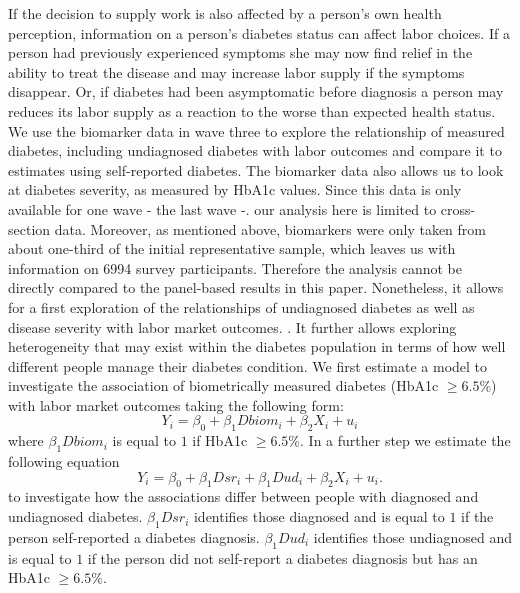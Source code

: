 \documentclass[12pt,english,british]{article}
\begin{document}
If the decision to supply work is also affected by a person's own health perception, information on a person's diabetes status can affect labor choices. If a person had previously experienced symptoms she may now find relief in the ability to treat the disease and may increase labor supply if the symptoms disappear. Or, if diabetes had been asymptomatic before diagnosis a person may reduces its labor supply as a reaction to the worse than expected health status.  We use the biomarker data in wave three to explore the relationship of measured diabetes, including undiagnosed diabetes with labor outcomes and compare it to estimates using self-reported diabetes. The biomarker data also allows us to look at diabetes severity, as measured
by \ac{HbA1c} values. Since this data is only available for one wave - the
last wave -. our analysis here is limited to cross-section data. Moreover,
as mentioned above, biomarkers were only taken from about one-third  of the initial representative sample, which leaves
us with information on 6994 survey participants. Therefore the analysis
cannot be directly compared to the panel-based results in this paper.
Nonetheless, it allows for a first exploration of the relationships
of undiagnosed diabetes as well as disease severity with labor market
outcomes. .  It further allows exploring
heterogeneity that may exist within the diabetes population
in terms of how well different people manage their diabetes condition.
We first estimate a model to investigate the association of biometrically  
measured diabetes (HbA1c $\geq6.5\%$) with labor market outcomes
taking the following form: 
\begin{equation}
Y_{i}=\beta_{0}+\beta_{1}Dbiom_{i}+\beta_{2}X_{i}+u_{i}\label{eq:diab_objective}
\end{equation}
where $\beta_{1}Dbiom_{i}$ is equal to $1$ if HbA1c $\geq6.5\%$.
In a further step we estimate the following equation 
\begin{equation}
Y_{i}=\beta_{0}+\beta_{1}Dsr_{i}+\beta_{1}Dud_{i}+\beta_{2}X_{i}+u_{i}.\label{eq:diab_sr_ud}
\end{equation}
to investigate how the associations differ between people with diagnosed
and undiagnosed diabetes. $\beta_{1}Dsr_{i}$ identifies those diagnosed
and is equal to $1$ if the person self-reported a diabetes diagnosis.
$\beta_{1}Dud_{i}$ identifies those undiagnosed and is equal to $1$
if the person did not self-report a diabetes diagnosis but has an
HbA1c $\geq6.5\%$.
\end{document}
